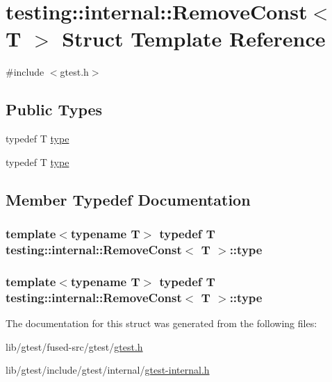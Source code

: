 \hypertarget{structtesting_1_1internal_1_1_remove_const}{\section{testing\-:\-:internal\-:\-:Remove\-Const$<$ T $>$ Struct Template Reference}
\label{structtesting_1_1internal_1_1_remove_const}
}


{\ttfamily \#include $<$gtest.\-h$>$}

\subsection*{Public Types}
\begin{DoxyCompactItemize}
\item 
typedef T \hyperlink{structtesting_1_1internal_1_1_remove_const_a1be32027ea4edcc0d15abd59aba4a97f}{type}
\item 
typedef T \hyperlink{structtesting_1_1internal_1_1_remove_const_a1be32027ea4edcc0d15abd59aba4a97f}{type}
\end{DoxyCompactItemize}


\subsection{Member Typedef Documentation}
\hypertarget{structtesting_1_1internal_1_1_remove_const_a1be32027ea4edcc0d15abd59aba4a97f}{
\subsubsection[{type}]{\setlength{\rightskip}{0pt plus 5cm}template$<$typename T$>$ typedef T {\bf testing\-::internal\-::\-Remove\-Const}$<$ T $>$\-::{\bf type}}}\label{structtesting_1_1internal_1_1_remove_const_a1be32027ea4edcc0d15abd59aba4a97f}
\hypertarget{structtesting_1_1internal_1_1_remove_const_a1be32027ea4edcc0d15abd59aba4a97f}{
\subsubsection[{type}]{\setlength{\rightskip}{0pt plus 5cm}template$<$typename T$>$ typedef T {\bf testing\-::internal\-::\-Remove\-Const}$<$ T $>$\-::{\bf type}}}\label{structtesting_1_1internal_1_1_remove_const_a1be32027ea4edcc0d15abd59aba4a97f}


The documentation for this struct was generated from the following files\-:\begin{DoxyCompactItemize}
\item 
lib/gtest/fused-\/src/gtest/\hyperlink{fused-src_2gtest_2gtest_8h}{gtest.\-h}\item 
lib/gtest/include/gtest/internal/\hyperlink{gtest-internal_8h}{gtest-\/internal.\-h}\end{DoxyCompactItemize}
